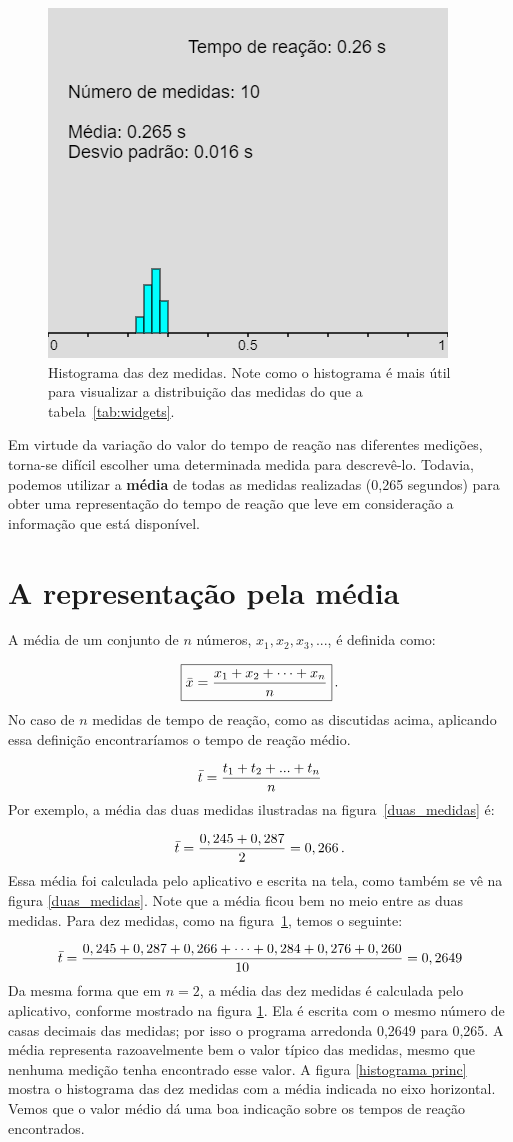 \documentclass[12pt, a4paper]{article}
\begin{document}
\begin{figure}[H]
\centering
\includegraphics[width=0.55\linewidth]{new app6.png}
\caption{\label{fig:app6} Histograma das dez medidas. Note como o histograma é mais útil para visualizar a distribuição das medidas do que a tabela~\ref{tab:widgets}.}
\end{figure}

Em virtude da variação do valor do tempo de reação nas diferentes medições, torna-se difícil escolher uma determinada medida para descrevê-lo. Todavia, podemos utilizar a \textbf{média} de todas as medidas realizadas (0,265 segundos) para obter uma representação do tempo de reação que leve em consideração a informação que está disponível.

\section{A representação pela média}

A média de um conjunto de $n$ números, $x_1, x_2, x_3, ...$, é definida como:

\[\boxed{\Bar{x} = \frac{x_1 + x_2 + \cdots + x_n}{n}}\, .\]
No caso de $n$ medidas de tempo de reação, como as discutidas acima, aplicando essa definição encontraríamos o tempo de reação médio. 

\[\Bar{t} = \frac{t_1 + t_2+...+t_n}{n}\]
Por exemplo, a média das duas medidas ilustradas na figura~\ref{duas_medidas} é:

\[\Bar{t}=\frac{0,245+0,287}{2}=0,266\, .\]
Essa média foi calculada pelo aplicativo e escrita na tela, como também se vê na figura \ref{duas_medidas}. Note que a média ficou bem no meio entre as duas medidas. Para dez medidas, como na figura~\ref{fig:app6}, temos o seguinte:

\[
\Bar{t} = \frac{0,245+0,287+0,266+\cdots+0,284+0,276+0,260}{10} 
          = 0,2649
\]
Da mesma forma que em $n=2$, a média das dez medidas é calculada pelo aplicativo, conforme mostrado na figura \ref{fig:app6}.  Ela é escrita com o mesmo número de casas decimais das medidas; por isso o programa arredonda 0,2649 para 0,265. A média representa razoavelmente bem o valor típico das medidas, mesmo que nenhuma medição tenha encontrado esse valor. A figura \ref{histograma princ} mostra o histograma das dez medidas com a média indicada no eixo horizontal. Vemos que o valor médio dá uma boa indicação sobre os tempos de reação encontrados.
\end{document}
